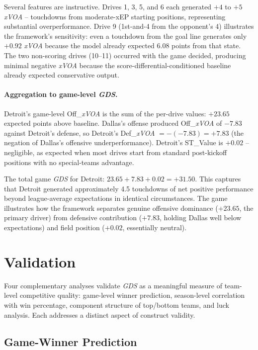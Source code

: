 \documentclass[12pt,a4paper]{article}
\newcommand{\xvoa}{\textit{xVOA}}
\newcommand{\gds}{\textit{GDS}}
\begin{document}
Several features are instructive. Drives 1, 3, 5, and 6 each generated $+4$ to $+5$ \xvoa{} -- touchdowns from moderate-xEP starting positions, representing substantial overperformance. Drive 9 (1st-and-4 from the opponent's 4) illustrates the framework's sensitivity: even a touchdown from the goal line generates only $+0.92$ \xvoa{} because the model already expected 6.08 points from that state. The two non-scoring drives (10--11) occurred with the game decided, producing minimal negative \xvoa{} because the score-differential-conditioned baseline already expected conservative output.

\paragraph{Aggregation to game-level \gds{}.}
Detroit's game-level Off\_\xvoa{} is the sum of the per-drive values: $+23.65$ expected points above baseline. Dallas's offense produced Off\_\xvoa{} of $-7.83$ against Detroit's defense, so Detroit's Def\_\xvoa{} $= -(-7.83) = +7.83$ (the negation of Dallas's offensive underperformance). Detroit's ST\_Value is $+0.02$ -- negligible, as expected when most drives start from standard post-kickoff positions with no special-teams advantage.

The total game \gds{} for Detroit: $23.65 + 7.83 + 0.02 = +31.50$. This captures that Detroit generated approximately 4.5 touchdowns of net positive performance beyond league-average expectations in identical circumstances. The game illustrates how the framework separates genuine offensive dominance ($+23.65$, the primary driver) from defensive contribution ($+7.83$, holding Dallas well below expectations) and field position ($+0.02$, essentially neutral).

\section{Validation}
\label{sec:validation}

Four complementary analyses validate \gds{} as a meaningful measure of team-level competitive quality: game-level winner prediction, season-level correlation with win percentage, component structure of top/bottom teams, and luck analysis. Each addresses a distinct aspect of construct validity.

\subsection{Game-Winner Prediction}
\end{document}
